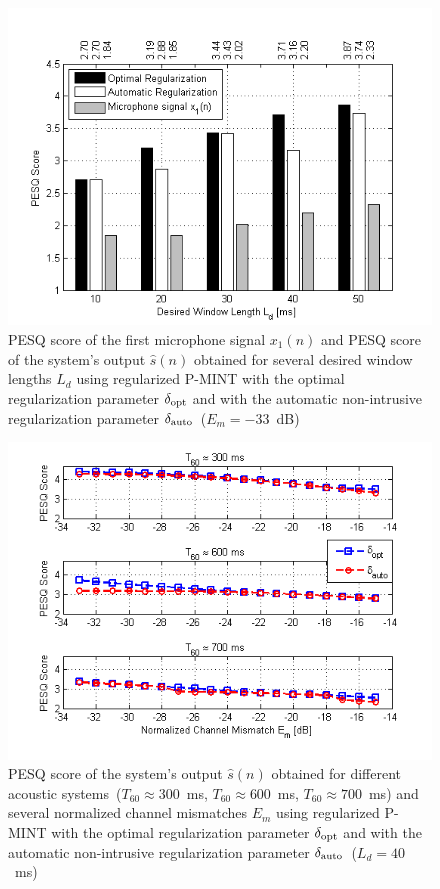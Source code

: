 \documentclass[draftcls,onecolumn,11pt]{IEEEtran}
\begin{document}
\begin{figure}[h]
\centering
\includegraphics[scale = 0.65]{Plots/PESQ_optandautofixederror_sys_5_error_-33}
\caption{PESQ score of the first microphone signal $x_1(n)$ and PESQ score of the system's output $\hat{s}(n)$ obtained for several desired window lengths $L_d$ using regularized P-MINT with the optimal regularization parameter $\delta_{\rm opt}$ and with the automatic non-intrusive regularization parameter $\delta_{\rm auto}$~($E_m = -33$~dB)}
\label{fig: autopesq1}
\end{figure}
\begin{figure}[h]
\centering
\includegraphics[scale = 0.65]{Plots/PESQ_optandautofixed_Ld_640}
\caption{PESQ score of the system's output $\hat{s}(n)$ obtained for different acoustic systems~($T_{60} \approx 300$~ms, $T_{60} \approx 600$~ms, $T_{60} \approx 700$~ms) and several normalized channel mismatches $E_m$ using regularized P-MINT with the optimal regularization parameter $\delta_{\rm opt}$ and with the automatic non-intrusive regularization parameter $\delta_{\rm auto}$~($L_d = 40$~ms)}
\label{fig: autopesq2}
\end{figure}
\end{document}
